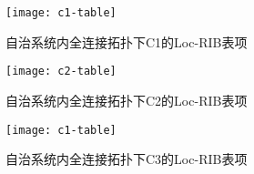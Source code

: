 
\begin{figure}
  \centering
  \texttt{[image: c1-table]}
  \caption{自治系统内全连接拓扑下C1的Loc-RIB表项}
  \label{fig:c1-table}
\end{figure}


\begin{figure}
  \centering
  \texttt{[image: c2-table]}
  \caption{自治系统内全连接拓扑下C2的Loc-RIB表项}
  \label{fig:c2-table}
\end{figure}

\begin{figure}
  \centering
  \texttt{[image: c1-table]}
  \caption{自治系统内全连接拓扑下C3的Loc-RIB表项}
  \label{fig:c3-table}
\end{figure}

